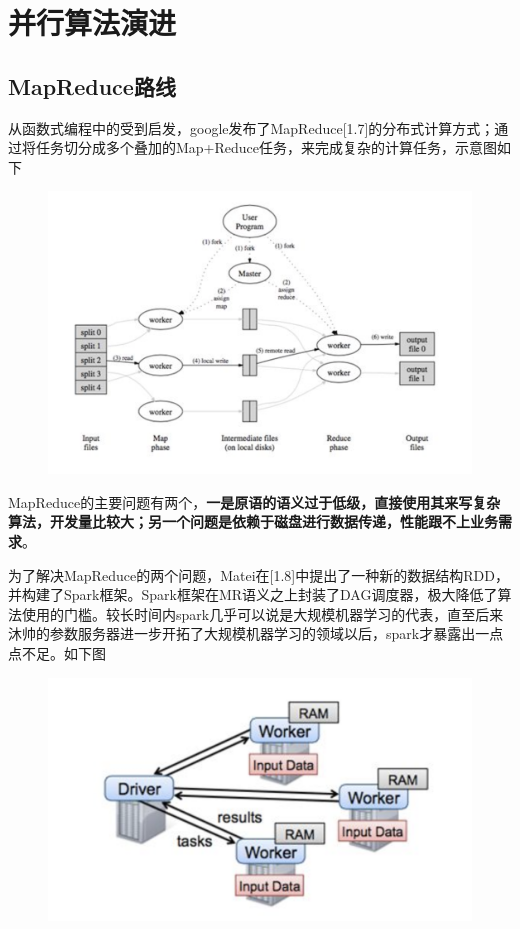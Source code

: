 \documentclass[12pt]{article}
\begin{document}
\section{并行算法演进}
\subsection{MapReduce路线}
从函数式编程中的受到启发，google发布了MapReduce[1.7]的分布式计算方式；通过将任务切分成多个叠加的Map+Reduce任务，来完成复杂的计算任务，示意图如下
\begin{figure}[H]
    \centering
    \includegraphics[width=1\textwidth]{fig/Large_Scale_Map_Reduce.png}
\end{figure}

MapReduce的主要问题有两个，\textbf{一是原语的语义过于低级，直接使用其来写复杂算法，开发量比较大；另一个问题是依赖于磁盘进行数据传递，性能跟不上业务需求}。

为了解决MapReduce的两个问题，Matei在[1.8]中提出了一种新的数据结构RDD，并构建了Spark框架。Spark框架在MR语义之上封装了DAG调度器，极大降低了算法使用的门槛。较长时间内spark几乎可以说是大规模机器学习的代表，直至后来沐帅的参数服务器进一步开拓了大规模机器学习的领域以后，spark才暴露出一点点不足。如下图
\begin{figure}[H]
    \centering
    \includegraphics[width=.5\textwidth]{fig/Large_Scale_RDD.png}
\end{figure}
\end{document}

